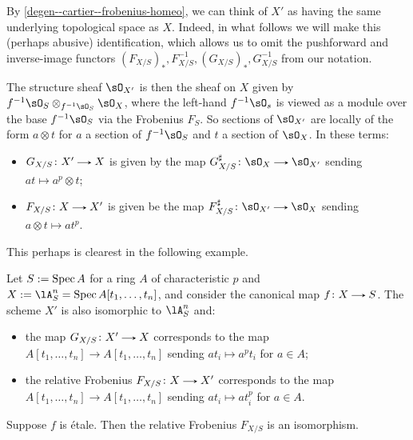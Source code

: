 \begin{nothing}
  \label{degen--cartier--frobenius-id}
  By \cref{degen--cartier--frobenius-homeo}, we can think of $X'$ as having the same underlying topological space as $X$. Indeed, in what follows we will make this (perhaps abusive) identification, which allows us to omit the pushforward and inverse-image functors $(F_{X/S})_*,F_{X/S}^{-1},(G_{X/S})_*,G_{X/S}^{-1}$ from our notation.

  The structure sheaf $\sO_{X'}$ is then the sheaf on $X$ given by $f^{-1}\sO_S \otimes_{f^{-1}\sO_S}\sO_X $, where the left-hand $f^{-1}\sO_s$ is viewed as a module over the base $f^{-1}\sO_S$ via the Frobenius $F_S$. So sections of $\sO_{X'}$ are locally of the form $a \otimes t$ for $a$ a section of $f^{-1}\sO_S$ and $t$ a section of $\sO_X$. In these terms:
  \begin{itemize}
  \item $G_{X/S} \c X' \to X$ is given by the map $G_{X/S}^\sharp \c \sO_X \to \sO_{X'}$ sending $at \mapsto a^p \otimes t$;
  \item $F_{X/S} \c X \to X'$ is given be the map $F_{X/S}^\sharp \c \sO_{X'} \to \sO_X$ sending $a \otimes t \mapsto at^p$.
  \end{itemize}
  This perhaps is clearest in the following example.
\end{nothing}

\begin{example}
  \label{degen--cartier--frobenius-eg}
  Let $S \mathrel{:=} \operatorname{Spec} A$ for a ring $A$ of characteristic $p$ and $X \ce \lA^n_S = \Spec A[t_1,\ldots,t_n]$, and consider the canonical map $f \c X \to S$. The scheme $X'$ is also isomorphic to $\lA^n_S$ and:
  \begin{itemize}
  \item the map $G_{X/S} \c X' \to X$ corresponds to the map $A[t_1,\ldots,t_n] \to A[t_1,\ldots,t_n]$ sending $at_i \mapsto a^pt_i$ for $a \in A$;
  \item the relative Frobenius $F_{X/S} \c X \to X'$ corresponds to the map $A[t_1,\ldots,t_n] \to A[t_1,\ldots,t_n]$ sending $at_i \mapsto at_i^p$ for $a \in A$.
  \end{itemize}
\end{example}

\begin{lemma}
  \label{degen--cartier--frobenius-etale}
  Suppose $f$ is \'{e}tale. Then the relative Frobenius $F_{X/S}$ is an isomorphism.
\end{lemma}

